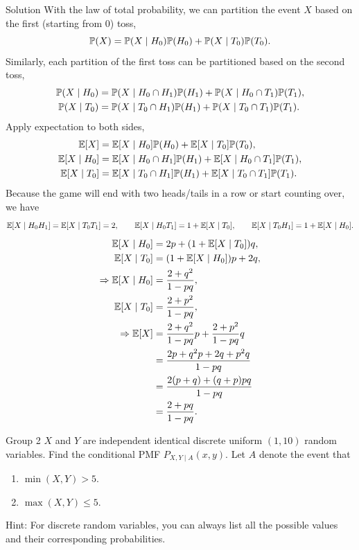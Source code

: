 \documentclass{article}
\begin{document}
\begin{solution}
    {Solution}
    With the law of total probability, we can partition the event $X$ based on the first (starting from $0$) toss,
    \[
        \P{X}=\P{X\mid H_0}\P{H_0}+\P{X\mid T_0}\P{T_0}.
    \]
    Similarly, each partition of the first toss can be partitioned based on the second toss,
    \begin{align*}
        \P{X\mid H_0} &= \P{X\mid H_0\cap H_1}\P{H_1}+\P{X\mid H_0\cap T_1}\P{T_1}, \\
        \P{X\mid T_0} &= \P{X\mid T_0\cap H_1}\P{H_1}+\P{X\mid T_0\cap T_1}\P{T_1}.
    \end{align*}
    Apply expectation to both sides,
    \begin{align*}
        \E{X} &= \E{X\mid H_0}\P{H_0}+\E{X\mid T_0}\P{T_0}, \\
        \E{X\mid H_0} &= \E{X\mid H_0\cap H_1}\P{H_1}+\E{X\mid H_0\cap T_1}\P{T_1}, \\
        \E{X\mid T_0} &= \E{X\mid T_0\cap H_1}\P{H_1}+\E{X\mid T_0\cap T_1}\P{T_1}.
    \end{align*}
    Because the game will end with two heads/tails in a row or start counting over, we have
    \[
    \E{X\mid H_0H_1}= \E{X\mid T_0T_1}=2, \qquad \E{X\mid H_0T_1} = 1+\E{X\mid T_0}, \qquad \E{X\mid T_0H_1} = 1+\E{X\mid H_0}.
    \]
    \begin{align*}
        \E{X\mid H_0} &= 2p+(1+\E{X\mid T_0})q, \\
        \E{X\mid T_0} &= (1+\E{X\mid H_0})p+2q, \\
        \Rightarrow
        \E{X\mid H_0} &= \frac{2+q^2}{1-pq}, \\
        \E{X\mid T_0} &= \frac{2+p^2}{1-pq}, \\
        \Rightarrow
        \E{X} &= \frac{2+q^2}{1-pq}p+\frac{2+p^2}{1-pq}q \\
        &= \frac{2p+q^2p+2q+p^2q}{1-pq} \\
        &= \frac{2(p+q)+(q+p)pq}{1-pq} \\
        &= \frac{2+pq}{1-pq}.
    \end{align*}
\end{solution}

\begin{problem}
    {Group 2}
    $X$ and $Y$ are independent identical discrete uniform $(1, 10)$ random variables. Find the conditional PMF $P_{X,Y \mid A}(x, y)$. Let $A$ denote the event that
    \begin{enumerate}
        \item $\min(X, Y) > 5$.
        \item $\max(X, Y) \leq 5$.
    \end{enumerate}
    \begin{solution}
        {Hint:}
        For discrete random variables, you can always list all the possible values and their corresponding probabilities.
    \end{solution}
\end{problem}
\end{document}
